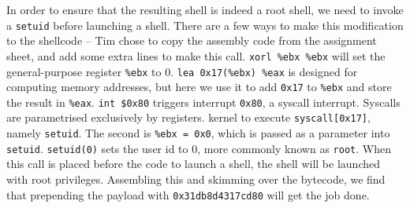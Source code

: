 In order to ensure that the resulting shell is indeed a root shell, we need to invoke a {\tt setuid} before launching a
shell. There are a few ways to make this modification to the shellcode -- Tim chose to copy the assembly code from the
assignment sheet, and add some extra lines to make this call. {\tt xorl \%ebx \%ebx} will set the general-purpose
register {\tt \%ebx} to 0. {\tt lea 0x17(\%ebx) \%eax} is designed for computing memory addresses, but here we use it to
add {\tt 0x17} to {\tt \%ebx} and store the result in {\tt \%eax}. {\tt int \$0x80} triggers interrupt {\tt 0x80}, a
syscall interrupt. Syscalls are parametrised exclusively by
registers.%
kernel to execute {\tt syscall[0x17]}, namely {\tt setuid}. The second is {\tt \%ebx = 0x0}, which is passed as a
parameter into {\tt setuid}. {\tt setuid(0)} sets the user id to 0, more commonly known as {\tt root}. When this call is
placed before the code to launch a shell, the shell will be launched with root privileges. Assembling this and skimming
over the bytecode, we find that prepending the payload with {\tt 0x31db8d4317cd80} will get the job done.

